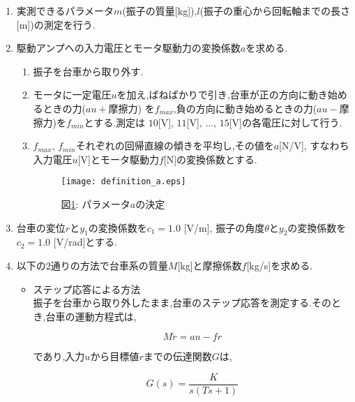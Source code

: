 \documentclass[a4j,11pt,twoside]{jbook}
\begin{document}
\begin{enumerate}
    \item 実測できるパラメータ$m$(振子の質量[kg]),$l$(振子の重心から回転軸までの長さ[m])の測定を行う.
    \item 駆動アンプへの入力電圧とモータ駆動力の変換係数$a$を求める.
    \begin{enumerate}
        \item 振子を台車から取り外す.
        \item モータに一定電圧$u$を加え,ばねばかりで引き,台車が正の方向に動き始めるときの力($au+$摩擦力)
        を$f_{max}$,負の方向に動き始めるときの力($au-$摩擦力)を$f_{min}$とする.測定は
        $10$[V], $11$[V], ..., $15$[V]の各電圧に対して行う.
        \item $f_{max}$, $f_{min}$それぞれの回帰直線の傾きを平均し,その値を$a$[N/V],
        すなわち入力電圧$u$[V]とモータ駆動力$f$[N]の変換係数とする.
        \begin{figure}[htbp]
            \begin{center}
                \texttt{[image: definition\_a.eps]}
                \caption{図\ref{definition_a}: パラメータ$a$の決定}
                \label{definition_a}
            \end{center}
        \end{figure}
    \end{enumerate}

    \item 台車の変位$r$と$y_{1}$の変換係数を$c_{1} = 1.0$ [V/m], 
    振子の角度$\theta$と$y_{2}$の変換係数を$c_{2} = 1.0$ [V/rad]とする.

    \item 以下の2通りの方法で台車系の質量$M$[kg]と摩擦係数$f$[kg/s]を求める.
    \begin{itemize}
        \item ステップ応答による方法　\\
        \quad 振子を台車から取り外したまま,台車のステップ応答を測定する.そのとき,台車の運動方程式は,

        \begin{equation}
            M \ddot r = au - fr
            \label{eq_model}
        \end{equation}

        であり,入力$u$から目標値$r$までの伝達関数$G$は,

        \begin{equation}
            G(s) = \frac{K}{s(Ts + 1)}
        \end{equation}


\end{itemize}
\end{enumerate}
\end{document}
